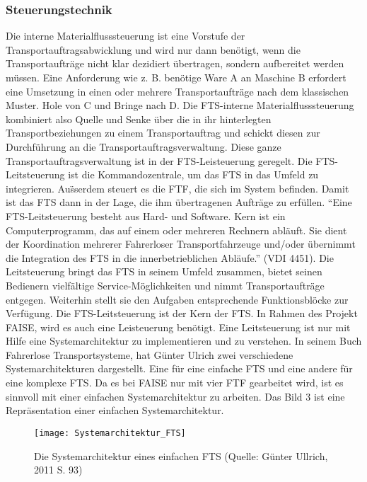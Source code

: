 \subsubsection{Steuerungstechnik}
Die interne Materialflusssteuerung ist eine Vorstufe der Transportauftragsabwicklung und wird nur dann ben\"otigt, wenn die Transportauftr\"age nicht klar dezidiert \"ubertragen, sondern aufbereitet werden m\"ussen. Eine Anforderung wie z. B. ben\"otige Ware A an Maschine B erfordert eine Umsetzung in einen oder mehrere Transportauftr\"age nach dem klassischen Muster. Hole von C und Bringe nach D. Die FTS-interne Materialflusssteuerung kombiniert also Quelle und Senke \"uber die in ihr hinterlegten Transportbeziehungen zu einem Transportauftrag und schickt diesen zur Durchf\"uhrung an die Transportauftragsverwaltung. Diese ganze Transportauftragsverwaltung ist in der FTS-Leisteuerung geregelt. 
Die FTS-Leitsteuerung ist die Kommandozentrale, um das FTS in das Umfeld zu integrieren. Au\"sserdem steuert es die FTF, die sich im System befinden. Damit ist das FTS dann in der 
Lage, die ihm \"ubertragenen Auftr\"age zu erf\"ullen. "`Eine FTS-Leitsteuerung besteht aus Hard- und Software. Kern ist ein Computerprogramm, das auf einem oder mehreren Rechnern abl\"auft. Sie dient der Koordination mehrerer Fahrerloser Transportfahrzeuge und/oder \"ubernimmt die Integration des FTS in die innerbetrieblichen Abl\"aufe."' (VDI 4451). Die Leitsteuerung bringt das FTS in seinem Umfeld zusammen, bietet seinen Bedienern vielf\"altige Service-M\"oglichkeiten und nimmt Transportauftr\"age entgegen. Weiterhin stellt sie den Aufgaben entsprechende Funktionsbl\"ocke zur Verf\"ugung. 
Die FTS-Leitsteuerung ist der Kern der FTS. In Rahmen des Projekt FAISE, wird es auch eine Leisteuerung ben\"otigt. Eine Leitsteuerung ist nur mit Hilfe eine Systemarchitektur zu implementieren und zu verstehen. In seinem Buch Fahrerlose Transportsysteme, hat G\"unter Ulrich zwei verschiedene Systemarchitekturen dargestellt. Eine f\"ur eine einfache FTS und eine andere f\"ur eine komplexe FTS. Da es bei FAISE nur mit vier FTF gearbeitet wird, ist es sinnvoll mit einer einfachen Systemarchitektur zu arbeiten. Das Bild 3 ist eine Repr\"asentation einer einfachen Systemarchitektur.
	\begin{figure}[h!]
	\centering
  \texttt{[image: Systemarchitektur\_FTS]}
	\caption{Die Systemarchitektur eines einfachen FTS (Quelle: G\"unter Ullrich, 2011 S. 93)}
	\label{Systemarchitektur_FTS}
\end{figure}

